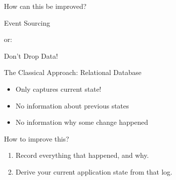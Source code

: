 \begin{frame}[fragile]{}

\begin{center}
\LARGE
How can this be improved?
\end{center}             
                  
\end{frame}

\begin{frame}[fragile]{}

\begin{center}
{
\LARGE
Event Sourcing
}

\vspace{2em}

or:

\vspace{2em}

{
\Large
Don't Drop Data!
}
\end{center}
\end{frame}

\begin{frame}[fragile]{The Classical Approach: Relational Database}

\begin{itemize}                
\item Only captures current state!
\item No information about previous states
\item No information why some change happened
\end{itemize}
                   
\end{frame}

\begin{frame}[fragile]{How to improve this?}

\renewcommand{\SPACE}{1em}

\begin{enumerate}
\item Record everything that happened, and why.
\item Derive your current application state from that log.
\end{enumerate}         
                  
\end{frame}

